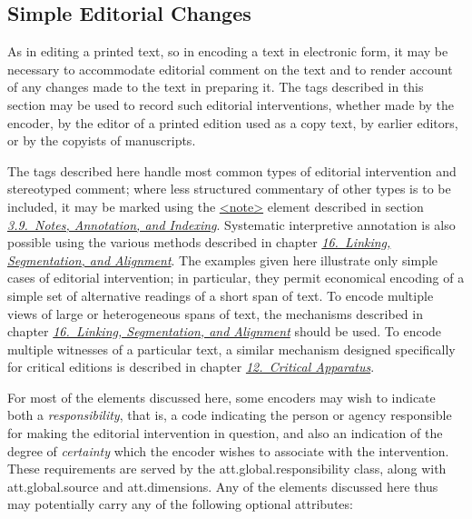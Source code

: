 \subsection[{Simple Editorial Changes}]{Simple Editorial Changes}\label{COED}\par
As in editing a printed text, so in encoding a text in electronic form, it may be necessary to accommodate editorial comment on the text and to render account of any changes made to the text in preparing it. The tags described in this section may be used to record such editorial interventions, whether made by the encoder, by the editor of a printed edition used as a copy text, by earlier editors, or by the copyists of manuscripts.\par
The tags described here handle most common types of editorial intervention and stereotyped comment; where less structured commentary of other types is to be included, it may be marked using the \hyperref[TEI.note]{<note>} element described in section \textit{\hyperref[CONO]{3.9.\ Notes, Annotation, and Indexing}}. Systematic interpretive annotation is also possible using the various methods described in chapter \textit{\hyperref[SA]{16.\ Linking, Segmentation, and Alignment}}. The examples given here illustrate only simple cases of editorial intervention; in particular, they permit economical encoding of a simple set of alternative readings of a short span of text. To encode multiple views of large or heterogeneous spans of text, the mechanisms described in chapter \textit{\hyperref[SA]{16.\ Linking, Segmentation, and Alignment}} should be used. To encode multiple witnesses of a particular text, a similar mechanism designed specifically for critical editions is described in chapter \textit{\hyperref[TC]{12.\ Critical Apparatus}}.\par
For most of the elements discussed here, some encoders may wish to indicate both a \textit{responsibility}, that is, a code indicating the person or agency responsible for making the editorial intervention in question, and also an indication of the degree of \textit{certainty} which the encoder wishes to associate with the intervention. These requirements are served by the \textsf{att.global.responsibility} class, along with \textsf{att.global.source} and \textsf{att.dimensions}. Any of the elements discussed here thus may potentially carry any of the following optional attributes: 
